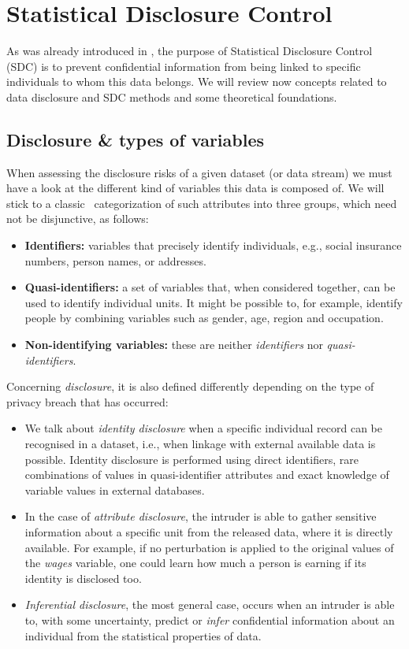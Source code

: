\section{Statistical Disclosure Control}
\label{Theory::SDC}

As was already introduced in , the purpose of Statistical Disclosure Control (SDC) is to prevent confidential information from being linked to specific individuals to whom this data belongs. We will review now concepts related to data disclosure and SDC methods and some theoretical foundations.

\subsection{Disclosure \& types of variables}

When assessing the disclosure risks of a given dataset (or data stream) we must have a look at the different kind of variables this data is composed of. We will stick to a classic~\citep{Templ:IntroSDC} categorization of such attributes into three groups, which need not be disjunctive, as follows:

\begin{itemize}
	\item \textbf{Identifiers:} variables that precisely identify individuals, e.g., social insurance numbers, person names, or addresses.
	\item \textbf{Quasi-identifiers:} a set of variables that, when considered together, can be used to identify individual units. It might be possible to, for example, identify people by combining variables such as gender, age, region and occupation.
	\item \textbf{Non-identifying variables:} these are neither \textit{identifiers} nor \textit{quasi-identifiers}.
\end{itemize}

Concerning \textit{disclosure}, it is also defined differently depending on the type of privacy breach that has occurred:

\begin{itemize}
	\item We talk about \textit{identity disclosure} when a specific individual record can be recognised in a dataset, i.e., when linkage with external available data is possible. Identity disclosure is performed using direct identifiers, rare combinations of values in quasi-identifier attributes and exact knowledge of variable values in external databases.
	\item In the case of \textit{attribute disclosure}, the intruder is able to gather sensitive information about a specific unit from the released data, where it is directly available. For example, if no perturbation is applied to the original values of the \textit{wages} variable, one could learn how much a person is earning if its identity is disclosed too.
	\item \textit{Inferential disclosure}, the most general case, occurs when an intruder is able to, with some uncertainty, predict or \textit{infer} confidential information about an individual from the statistical properties of data.
\end{itemize}

